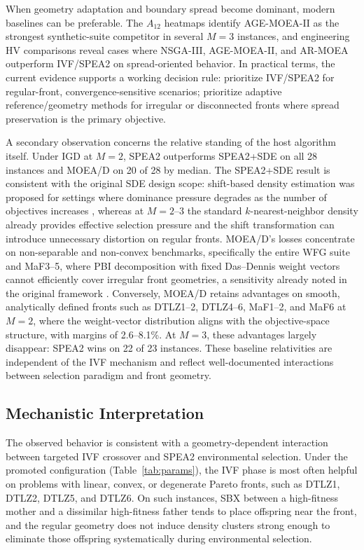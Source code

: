 \documentclass[pdflatex,sn-mathphys-ay]{sn-jnl}%
\theoremstyle{thmstyleone}%
\theoremstyle{thmstyletwo}%
\theoremstyle{thmstylethree}%
\begin{document}
When geometry adaptation and boundary spread become dominant, modern baselines can be preferable. The $A_{12}$ heatmaps identify AGE-MOEA-II as the strongest synthetic-suite competitor in several $M=3$ instances, and engineering HV comparisons reveal cases where NSGA-III, AGE-MOEA-II, and AR-MOEA outperform IVF/SPEA2 on spread-oriented behavior. In practical terms, the current evidence supports a working decision rule: prioritize IVF/SPEA2 for regular-front, convergence-sensitive scenarios; prioritize adaptive reference/geometry methods for irregular or disconnected fronts where spread preservation is the primary objective.

A secondary observation concerns the relative standing of the host algorithm itself. Under IGD at $M=2$, SPEA2 outperforms SPEA2+SDE on all 28 instances and MOEA/D on 20 of 28 by median. The SPEA2+SDE result is consistent with the original SDE design scope: shift-based density estimation was proposed for settings where dominance pressure degrades as the number of objectives increases \citep{li2014shift}, whereas at $M=2$--$3$ the standard $k$-nearest-neighbor density already provides effective selection pressure and the shift transformation can introduce unnecessary distortion on regular fronts. MOEA/D's losses concentrate on non-separable and non-convex benchmarks, specifically the entire WFG suite and MaF3--5, where PBI decomposition with fixed Das--Dennis weight vectors cannot efficiently cover irregular front geometries, a sensitivity already noted in the original framework \citep{zhang2007moead}. Conversely, MOEA/D retains advantages on smooth, analytically defined fronts such as DTLZ1--2, DTLZ4--6, MaF1--2, and MaF6 at $M=2$, where the weight-vector distribution aligns with the objective-space structure, with margins of 2.6--8.1\%. At $M=3$, these advantages largely disappear: SPEA2 wins on 22 of 23 instances. These baseline relativities are independent of the IVF mechanism and reflect well-documented interactions between selection paradigm and front geometry.

\subsection{Mechanistic Interpretation}\label{subsec:discussion-mechanism}
The observed behavior is consistent with a geometry-dependent interaction between targeted IVF crossover and SPEA2 environmental selection. Under the promoted configuration (Table~\ref{tab:params}), the IVF phase is most often helpful on problems with linear, convex, or degenerate Pareto fronts, such as DTLZ1, DTLZ2, DTLZ5, and DTLZ6. On such instances, SBX between a high-fitness mother and a dissimilar high-fitness father tends to place offspring near the front, and the regular geometry does not induce density clusters strong enough to eliminate those offspring systematically during environmental selection.
\end{document}
